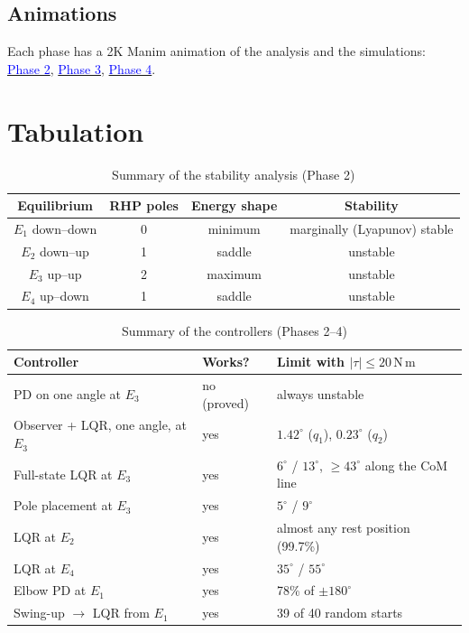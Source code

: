 \documentclass[12pt,a4paper]{article}
\newcommand{\Nm}{\,\mathrm{N\,m}}
\begin{document}
\subsection{Animations}
Each phase has a 2K Manim animation of the analysis and the simulations:
\href{https://drive.google.com/file/d/19THfoXXzbdMtbteCKE4v0VRLpV869wE0/view?usp=sharing}{\textcolor{blue}{Phase 2}},
\href{https://drive.google.com/file/d/1c-7Yy664ZP4TCJIeDbrAmFozHC8frao1/view?usp=sharing}{\textcolor{blue}{Phase 3}},
\href{https://drive.google.com/file/d/1jPQRn3W-bvUyvSKlHvYmX74bfPX9N16P/view?usp=sharing}{\textcolor{blue}{Phase 4}}.

\section{Tabulation}
\begin{table}[H]
\centering
\caption{Summary of the stability analysis (Phase 2)}
\begin{tabular}{|c|c|c|c|}
\hline
Equilibrium & RHP poles & Energy shape & Stability\\ \hline
$E_1$ down--down & 0 & minimum & marginally (Lyapunov) stable\\
$E_2$ down--up & 1 & saddle & unstable\\
$E_3$ up--up & 2 & maximum & unstable\\
$E_4$ up--down & 1 & saddle & unstable\\ \hline
\end{tabular}
\end{table}
\begin{table}[H]
\centering
\caption{Summary of the controllers (Phases 2--4)}
\small
\begin{tabular}{|l|l|l|}
\hline
Controller & Works? & Limit with $|\tau|\le20\Nm$\\ \hline
PD on one angle at $E_3$ & no (proved) & always unstable\\
Observer + LQR, one angle, at $E_3$ & yes & $1.42^\circ$ ($q_1$), $0.23^\circ$ ($q_2$)\\
Full-state LQR at $E_3$ & yes & $6^\circ$ / $13^\circ$, $\ge43^\circ$ along the CoM line\\
Pole placement at $E_3$ & yes & $5^\circ$ / $9^\circ$\\
LQR at $E_2$ & yes & almost any rest position (99.7\%)\\
LQR at $E_4$ & yes & $35^\circ$ / $55^\circ$\\
Elbow PD at $E_1$ & yes & 78\% of $\pm180^\circ$\\
Swing-up $\to$ LQR from $E_1$ & yes & 39 of 40 random starts\\ \hline
\end{tabular}
\end{table}
\end{document}
